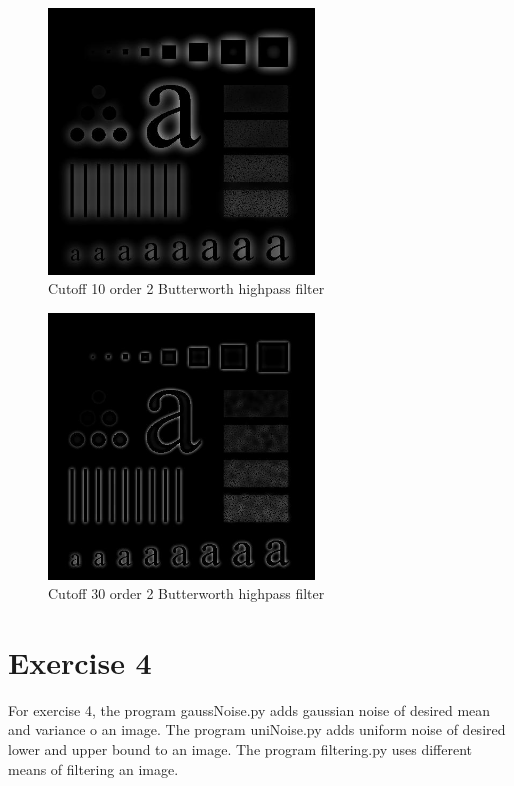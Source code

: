 \documentclass[10pt]{article}
\begin{document}
\begin{figure}[!ht]
	\centering
	\includegraphics[height=200pt]{./ex3/ch_butter_high_10.jpg}
	\caption{Cutoff 10 order 2 Butterworth highpass filter}
\end{figure}
\begin{figure}[!ht]
	\centering
	\includegraphics[height=200pt]{./ex3/ch_butter_high_30.jpg}
	\caption{Cutoff 30 order 2 Butterworth highpass filter}
\end{figure}

\clearpage

\section{Exercise 4}
For exercise 4, the program gaussNoise.py adds gaussian noise of desired mean and variance o an image.
The program uniNoise.py adds uniform noise of desired lower and upper bound to an image.
The program filtering.py uses different means of filtering an image.
\end{document}
